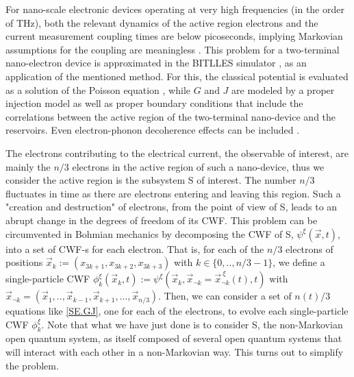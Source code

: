 \documentclass[11pt, a4paper]{article} %
\begin{document}
For nano-scale electronic devices operating at very high frequencies (in the order of THz), both the relevant dynamics of the active region electrons and the current measurement coupling times are below picoseconds, implying Markovian assumptions for the coupling are meaningless \cite{Thz}. This problem for a two-terminal nano-electron device is approximated in the BITLLES simulator \cite{tdp,Pois,Thz}, as an application of the mentioned method. For this, the classical potential is evaluated as a solution of the Poisson equation \cite{Pois}, while $G$ and $J$ are modeled by a proper injection model \cite{inject} as well as proper boundary conditions \cite{boundary1, boundary2} that include the correlations between the active region of the two-terminal nano-device and the reservoirs. Even electron-phonon decoherence effects can be included \cite{eph}.

The electrons contributing to the electrical current, the observable of interest, are mainly the $n/3$ electrons in the active region of such a nano-device, thus we consider the active region is the subsystem S of interest. The number $n/3$ fluctuates in time as there are electrons entering and leaving this region. Such a "creation and destruction" of electrons, from the point of view of S, leads to an abrupt change in the degrees of freedom of its CWF. This problem can be circumvented in Bohmian mechanics by decomposing the CWF of S, $\psi^{\xi}(\vec{x},t)$, into a set of CWF-s for each electron. That is, for each of the $n/3$ electrons of positions $\vec{x}_k:=(x_{3k+1}, x_{3k+2}, x_{3k+3})$ with $k\in\{0,..,n/3-1\}$, we define a single-particle CWF $\phi_k^\xi(\vec{x}_k, t):=\psi^{\xi}(\vec{x}_k, \vec{x}_{\neg k}=\vec{x}_{\neg k}^{\:\xi}(t),t)$ with $\vec{x}_{\neg k}=(\vec{x}_1,..,\vec{x}_{k-1}, \vec{x}_{k+1}, ...,\vec{x}_{n/3})$. Then, we can consider a set of $n(t)/3$ equations like \eqref{SE.GJ}, one for each of the electrons, to evolve each single-particle CWF $\phi_k^\xi$. Note that what we have just done is to consider S, the non-Markovian open quantum system, as itself composed of several open quantum systems that will interact with each other in a non-Markovian way. This turns out to simplify the problem.
\end{document}
